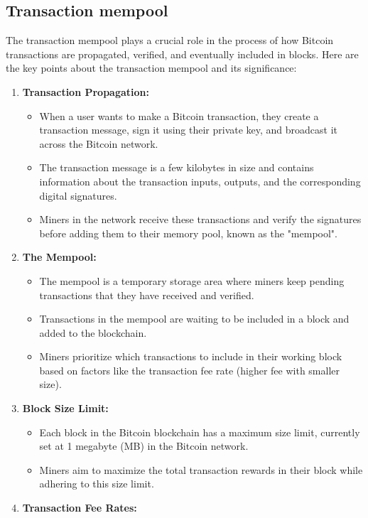 \subsection{Transaction mempool}
The transaction mempool plays a crucial role in the process of how Bitcoin transactions are propagated, verified, and eventually included in blocks. Here are the key points about the transaction mempool and its significance:
\begin{enumerate}
	\item \textbf{Transaction Propagation:}
	\begin{itemize}
		\item When a user wants to make a Bitcoin transaction, they create a transaction message, sign it using their private key, and broadcast it across the Bitcoin network.
		\item The transaction message is a few kilobytes in size and contains information about the transaction inputs, outputs, and the corresponding digital signatures.
		\item Miners in the network receive these transactions and verify the signatures before adding them to their memory pool, known as the "mempool".
	\end{itemize}
	\item \textbf{The Mempool:}
	\begin{itemize}
		\item The mempool is a temporary storage area where miners keep pending transactions that they have received and verified.
		\item Transactions in the mempool are waiting to be included in a block and added to the blockchain.
		\item Miners prioritize which transactions to include in their working block based on factors like the transaction fee rate (higher fee with smaller size).
	\end{itemize}
	\item \textbf{Block Size Limit:}
	\begin{itemize}
		\item Each block in the Bitcoin blockchain has a maximum size limit, currently set at 1 megabyte (MB) in the Bitcoin network.
		\item Miners aim to maximize the total transaction rewards in their block while adhering to this size limit.
	\end{itemize}
	\item \textbf{Transaction Fee Rates:}
	\begin{itemize}

\end{itemize}
\end{enumerate}
